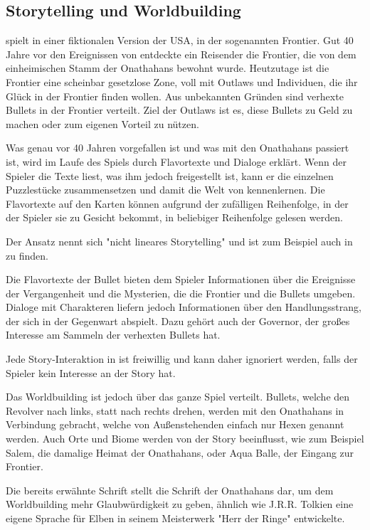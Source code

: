 \subsection{Storytelling und Worldbuilding}\label{subsec:storytellingUndWorldbuilding}

\FF spielt in einer fiktionalen Version der USA, in der sogenannten Frontier. Gut 40 Jahre vor den Ereignissen von \FF
entdeckte ein Reisender die Frontier, die von dem einheimischen Stamm der Onathahans bewohnt wurde. Heutzutage ist die Frontier
eine scheinbar gesetzlose Zone, voll mit Outlaws und Individuen, die ihr Glück in der Frontier finden wollen.
Aus unbekannten Gründen sind verhexte Bullets in der Frontier verteilt. Ziel der Outlaws ist es, diese Bullets zu Geld
zu machen oder zum eigenen Vorteil zu nützen.


Was genau vor 40 Jahren vorgefallen ist und was mit den Onathahans
passiert ist, wird im Laufe des Spiels durch Flavortexte und Dialoge erklärt. Wenn der Spieler die Texte liest,
was ihm jedoch freigestellt ist, kann er die einzelnen Puzzlestücke zusammensetzen und damit die Welt von \FF kennenlernen.
Die Flavortexte auf den Karten können aufgrund der zufälligen Reihenfolge, in der der Spieler sie zu Gesicht bekommt, in beliebiger Reihenfolge gelesen werden.


Der Ansatz nennt sich "nicht lineares Storytelling" und ist zum Beispiel auch in  zu finden.


Die Flavortexte der Bullet bieten dem Spieler Informationen über die Ereignisse der Vergangenheit und die Mysterien,
die die Frontier und die Bullets umgeben. Dialoge mit Charakteren liefern jedoch Informationen über den Handlungsstrang,
der sich in der Gegenwart abspielt. Dazu gehört auch \zB der Governor, der großes Interesse am Sammeln der verhexten Bullets hat.


Jede Story-Interaktion in \FF ist freiwillig und kann daher ignoriert werden, falls der Spieler kein Interesse an der Story hat.


Das Worldbuilding ist jedoch über das ganze Spiel verteilt. Bullets, welche den Revolver nach links, statt nach rechts drehen,
werden mit den Onathahans in Verbindung gebracht, welche von Außenstehenden einfach nur Hexen genannt werden.
Auch Orte und Biome werden von der Story beeinflusst, wie zum Beispiel Salem, die damalige Heimat der Onathahans, oder Aqua Balle,
der Eingang zur Frontier.


Die bereits erwähnte Schrift stellt die Schrift der Onathahans dar, um dem Worldbuilding mehr Glaubwürdigkeit zu geben,
ähnlich wie J.R.R. Tolkien eine eigene Sprache für Elben in seinem Meisterwerk "Herr der Ringe" entwickelte. 

\renewcommand{\kapitelautor}{}
